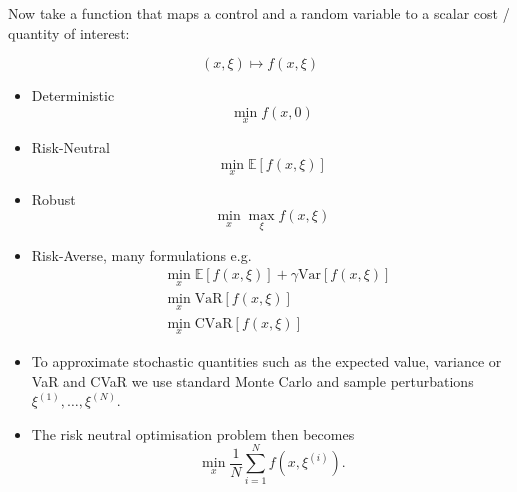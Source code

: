 \documentclass[aspectratio=1610, 10pt]{beamer}
\begin{document}
\begin{frame}
    Now take a function that maps a control and a random variable to a scalar cost / quantity of interest:

    \begin{minipage}{0.7\textwidth}
        \begin{equation}
            (x, \xi) \mapsto f(x, \xi)
        \end{equation}
        \begin{itemize}
            \item Deterministic
                \begin{equation}
                    \min_{x} f(x, 0)
                \end{equation}
            \item Risk-Neutral
                \begin{equation}
                    \min_{x} \mathbb{E}[f(x, \xi)]
                \end{equation}
            \item Robust
                \begin{equation}
                    \min_{x} \max_{\xi} f(x, \xi)
                \end{equation}
            \item Risk-Averse, many formulations e.g.
                \begin{equation}
                    \begin{aligned}
                        &\min_{x} \mathbb{E}[f(x, \xi)] + \gamma\mathrm{Var}[f(x, \xi)]\\
                        &\min_{x} \mathrm{VaR}[f(x, \xi)]\\
                        &\min_{x} \mathrm{CVaR}[f(x, \xi)]
                    \end{aligned}
                \end{equation}
        \end{itemize}
    \end{minipage}
\end{frame}
\begin{frame}
    \begin{itemize}
        \item To approximate stochastic quantities such as the expected value, variance or VaR and CVaR we use standard Monte Carlo and sample perturbations $\xi^{(1)}, \ldots, \xi^{(N)}$.
        \item The risk neutral optimisation problem then becomes
            \begin{equation}
                \min_{x} \frac1N \sum_{i=1}^N f(x, \xi^{(i)}).
            \end{equation}
    \end{itemize}
\end{frame}
\end{document}
